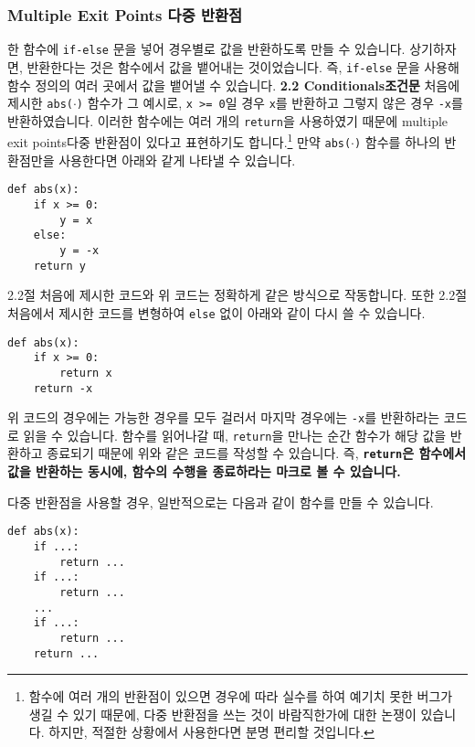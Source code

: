 \documentclass[../main.tex]{subfiles}
\begin{document}
\subsubsection{Multiple Exit Points 다중 반환점}
한 함수에 \texttt{if-else} 문을 넣어 경우별로 값을 반환하도록 만들 수 있습니다.
상기하자면, 반환한다는 것은 함수에서 값을 뱉어내는 것이었습니다.
즉, \verb|if-else| 문을 사용해 함수 정의의 여러 곳에서 값을 뱉어낼 수 있습니다.
\textbf{2.2 Conditionals조건문} 처음에 제시한 \texttt{abs($\cdot$)} 함수가 그
예시로, \texttt{x >= 0}일 경우 \texttt{x}를 반환하고 그렇지 않은 경우
\texttt{-x}를 반환하였습니다.  이러한 함수에는 여러 개의 \texttt{return}을
사용하였기 때문에 multiple exit points다중 반환점이 있다고 표현하기도
합니다.\footnote{함수에 여러 개의 반환점이 있으면 경우에 따라 실수를 하여 예기치
 못한 버그가 생길 수 있기 때문에, 다중 반환점을 쓰는 것이 바람직한가에 대한 논쟁이
있습니다. 하지만, 적절한 상황에서 사용한다면 분명 편리할 것입니다.} 만약
\texttt{abs($\cdot$)} 함수를 하나의 반환점만을 사용한다면 아래와 같게 나타낼 수
있습니다.
\begin{verbatim}
def abs(x):
    if x >= 0:
        y = x
    else:
        y = -x
    return y
\end{verbatim}
2.2절 처음에 제시한 코드와 위 코드는 정확하게 같은 방식으로 작동합니다.
또한 2.2절 처음에서 제시한 코드를 변형하여 \texttt{else} 없이
아래와 같이 다시 쓸 수 있습니다.
\begin{verbatim}
def abs(x):
    if x >= 0:
        return x
    return -x
\end{verbatim}
위 코드의 경우에는 가능한 경우를 모두 걸러서 마지막 경우에는 \texttt{-x}를
반환하라는 코드로 읽을 수 있습니다.
함수를 읽어나갈 때, \verb|return|을 만나는 순간 함수가 해당 값을 반환하고
종료되기 때문에 위와 같은 코드를 작성할 수 있습니다.
즉, \textbf{\texttt{return}은 함수에서 값을 반환하는 동시에, 함수의 수행을
종료하라는 마크로 볼 수 있습니다.}

다중 반환점을 사용할 경우, 일반적으로는 다음과 같이
함수를 만들 수 있습니다.
\begin{verbatim}
def abs(x):
    if ...:
        return ...
    if ...:
        return ...
    ...
    if ...:
        return ...
    return ...
\end{verbatim}
\end{document}
